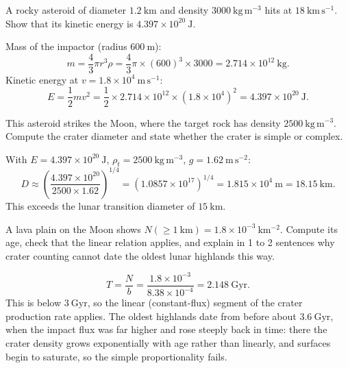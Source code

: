 \parti {} A rocky asteroid of diameter $1.2\ \mathrm{km}$ and density $3000\ \mathrm{kg\,m^{-3}}$ hits at $18\ \mathrm{km\,s^{-1}}$.
Show that its kinetic energy is $4.397 \times 10^{20}\ \mathrm{J}$.

\begin{solution}
Mass of the impactor (radius $600\ \mathrm{m}$):
\[
  m = \frac{4}{3}\pi r^3 \rho = \frac{4}{3}\pi \times (600)^3 \times 3000 = 2.714 \times 10^{12}\ \mathrm{kg}.
\]
Kinetic energy at $v = 1.8 \times 10^{4}\ \mathrm{m\,s^{-1}}$:
\[
  E = \frac{1}{2} m v^2 = \frac{1}{2} \times 2.714 \times 10^{12} \times (1.8 \times 10^{4})^2 = 4.397 \times 10^{20}\ \mathrm{J}.
\]
\end{solution}

\parti {} This asteroid strikes the Moon, where the target rock has density $2500\ \mathrm{kg\,m^{-3}}$.
Compute the crater diameter and state whether the crater is simple or complex.

\begin{solution}
With $E = 4.397 \times 10^{20}\ \mathrm{J}$, $\rho_t = 2500\ \mathrm{kg\,m^{-3}}$, $g = 1.62\ \mathrm{m\,s^{-2}}$:
\[
  D \approx \left( \frac{4.397 \times 10^{20}}{2500 \times 1.62} \right)^{1/4}
    = \left( 1.0857 \times 10^{17} \right)^{1/4}
    = 1.815 \times 10^{4}\ \mathrm{m} = 18.15\ \mathrm{km}.
\]
This exceeds the lunar transition diameter of $15\ \mathrm{km}$.
\end{solution}

\parti {} A lava plain on the Moon shows $N(\geq 1\ \mathrm{km}) = 1.8 \times 10^{-3}\ \mathrm{km^{-2}}$.
Compute its age, check that the linear relation applies, and explain in 1 to 2 sentences why crater counting cannot date the oldest lunar highlands this way.

\begin{solution}
\[
  T = \frac{N}{b} = \frac{1.8 \times 10^{-3}}{8.38 \times 10^{-4}} = 2.148\ \mathrm{Gyr}.
\]
This is below $3\ \mathrm{Gyr}$, so the linear (constant-flux) segment of the crater production rate applies.
The oldest highlands date from before about $3.6\ \mathrm{Gyr}$, when the impact flux was far higher and rose steeply back in time: there the crater density grows exponentially with age rather than linearly, and surfaces begin to saturate, so the simple proportionality fails.
\end{solution}


